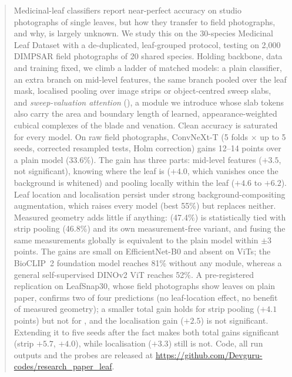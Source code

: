 \begin{abstract}
Medicinal-leaf classifiers report near-perfect accuracy on studio photographs of single leaves, but
how they transfer to field photographs, and why, is largely unknown. We study this on the 30-species
Medicinal Leaf Dataset with a de-duplicated, leaf-grouped protocol, testing on 2{,}000 DIMPSAR field
photographs of 20 shared species. Holding backbone, data and training fixed, we climb a ladder of
matched models: a plain classifier, an extra branch on mid-level features, the same branch pooled over
the leaf mask, localised pooling over image strips or object-centred sweep slabs, and
\emph{sweep-valuation attention} (\SVA{}), a module we introduce whose slab tokens also carry the area
and boundary length of learned, appearance-weighted cubical complexes of the blade and venation. Clean
accuracy is saturated for every model. On raw field photographs, ConvNeXt-T (5 folds $\times$ up to 5
seeds, corrected resampled tests, Holm correction) gains 12--14 points over a plain model (33.6\%). The
gain has three parts: mid-level features ($+3.5$, not significant), knowing where the leaf is ($+4.0$,
which vanishes once the background is whitened) and pooling locally within the leaf ($+4.6$ to $+6.2$).
Leaf location and localisation persist under strong background-compositing augmentation, which raises
every model (best 55\%) but replaces neither. Measured geometry adds little if anything: \SVA{}
(47.4\%) is statistically tied with strip pooling (46.8\%) and its own measurement-free variant, and
fusing the same measurements globally is equivalent to the plain model within $\pm3$ points. The
gains are small on EfficientNet-B0 and absent on ViTs; the BioCLIP~2 foundation model reaches 81\%
without any module, whereas a general self-supervised DINOv2 ViT reaches 52\%. A pre-registered replication on
LeafSnap30, whose field photographs show leaves on plain paper, confirms two of four predictions
(no leaf-location effect, no benefit of measured geometry); a smaller total gain holds for strip
pooling ($+4.1$ points) but not for \SVA{}, and the localisation gain ($+2.5$) is not significant. Extending it to five seeds after the fact makes
both total gains significant (strip $+5.7$, \SVA{} $+4.0$), while localisation ($+3.3$) still is not. Code, all run outputs and the probes are released at
\url{https://github.com/Devguru-codes/research_paper_leaf}.
\end{abstract}
